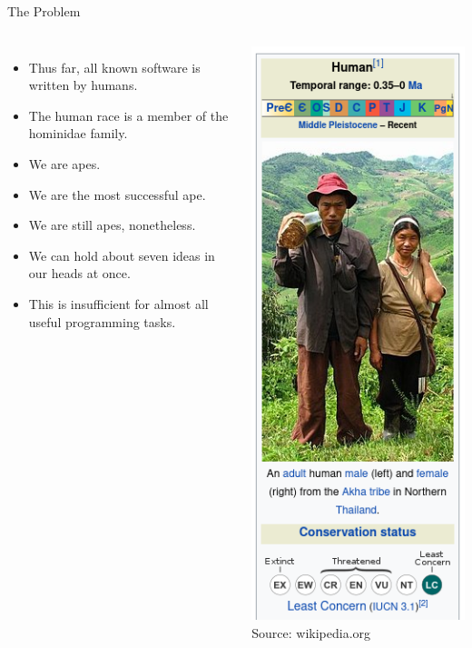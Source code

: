 \documentclass[]{beamer}
\begin{document}
\begin{frame}{The Problem}
\begin{columns}
    \begin{itemize}[<+->]
        \item Thus far, all known software is written by humans.
        \item The human race is a member of the hominidae family.
        \item We are apes.
        \item We are the most successful ape.
        \item We are still apes, nonetheless.  
        \item We can hold about seven ideas in our heads at once.
        \item This is insufficient for almost all useful programming
            tasks.
    \end{itemize}

        \begin{center}
            \includegraphics[height=0.75\textheight]{images/human}
            \newline
            {\tiny Source: wikipedia.org}
        \end{center}

\end{columns}
\end{frame}
\end{document}
